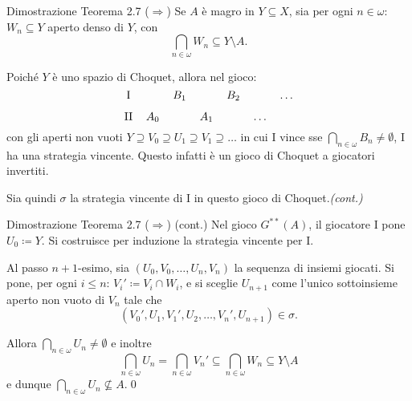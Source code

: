 \documentclass[babel]{beamer}
\renewcommand{\href}[2]{#2}
\begin{document}
\begin{frame}[label={sec:orgc8e3bc0}]{Dimostrazione Teorema 2.7 (\(\Rightarrow\))}
Se \(A\) è magro in \(Y \subseteq X\), sia per ogni \(n \in \omega\): \(W_{n} \subseteq Y\) aperto denso di \(Y\), con
\begin{equation*}
\bigcap_{n \in\omega} W_{n} \subseteq Y \setminus A.
\end{equation*}

\href{../../../../../../../org/roam/20250514174255-gioco_di_choquet.org}{Poiché} \(Y\) è uno \href{../../../../../../../org/roam/20250514174255-gioco_di_choquet.org}{spazio di Choquet}, allora nel \href{../../../../../../../org/roam/20250513171520-giochi_di_gale_stewart.org}{gioco}:
\begin{equation*}
\begin{tikzcd}[ampersand replacement=\&,cramped, sep=tiny]
	{\text{I}} \&\& {B_1} \&\& {B_2} \&\& \dots \\
	{\text{II}} \& {A_0} \&\& {A_1} \&\& \dots
\end{tikzcd}
\end{equation*}
con gli aperti non vuoti \(Y\supseteq V_{0}\supseteq U_{1}\supseteq V_{1}\supseteq \dots\) in cui I vince sse \(\bigcap_{n \in \omega}{B_{n}} \neq \emptyset\), I ha una \href{../../../../../../../org/roam/20250513171520-giochi_di_gale_stewart.org}{strategia vincente}. Questo infatti è un gioco di Choquet a giocatori invertiti.

Sia quindi \(\sigma\) la strategia vincente di I in questo gioco di Choquet.\hfill \textit{(cont.)}
\end{frame}
\begin{frame}[label={sec:org50d7230}]{Dimostrazione Teorema 2.7 (\(\Rightarrow\)) (cont.)}
Nel gioco \(G^{**}(A)\), il giocatore I pone \(U_{0} \coloneqq Y\). Si costruisce per induzione la strategia vincente per I.

Al passo \(n+1\)-esimo, sia \((U_{0},V_{0},\dots, U_{n}, V_{n})\) la sequenza di insiemi giocati. Si pone, per ogni \(i\le n\): \(V_{i}'\coloneqq V_{i}\cap W_{i}\), e si sceglie \(U_{n+1}\) come l'unico sottoinsieme aperto non vuoto di \(V_{n}\) tale che
\begin{equation*}
(V_{0}', U_{1}, V_{1}', U_{2},\dots, V_{n}', U_{n+1}) \in\sigma.
\end{equation*}

Allora \(\bigcap_{n \in \omega} U_{n}\neq\emptyset\) e inoltre
\begin{equation*}
\bigcap_{n \in\omega} U_{n} = \bigcap_{n \in\omega} V_{n}' \subseteq \bigcap_{n \in \omega} W_{n} \subseteq Y\setminus A
\end{equation*}
e dunque \(\bigcap_{n \in\omega} U_{n} \not\subseteq A\).\qed
\end{frame}
\end{document}
